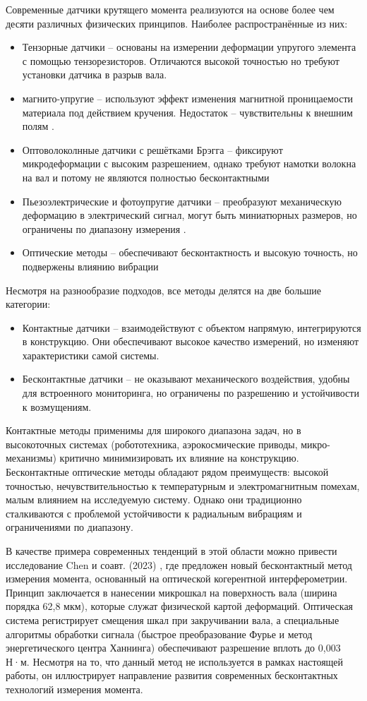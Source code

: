 Современные датчики крутящего момента реализуются на основе более чем десяти различных физических принципов. Наиболее распространённые из них:
\begin{itemize}
	\item Тензорные датчики -- основаны на измерении деформации упругого элемента с помощью тензорезисторов. Отличаются высокой точностью но требуют установки датчика в разрыв вала\cite{}.
	\item магнито-упругие -- используют эффект изменения магнитной проницаемости материала под действием кручения. Недостаток -- чувствительны к внешним полям \cite{}.
	\item Оптоволоколнные датчики с решётками Брэгга -- фиксируют микродеформации с высоким разрешением, однако требуют намотки волокна на вал и потому не являются полностью бесконтактными \cite{}%
	\item Пьезоэлектрические и фотоупругие датчики -- преобразуют механическую деформацию в электрический сигнал, могут быть миниатюрных размеров, но ограничены по диапазону измерения \cite{}.
	\item Оптические методы -- обеспечивают бесконтактность и высокую точность, но подвержены влиянию вибрации \cite{}
\end{itemize}
Несмотря на разнообразие подходов, все методы делятся на две большие категории:
\begin{itemize}
	\item Контактные датчики -- взаимодействуют с объектом напрямую, интегрируются в конструкцию. Они обеспечивают высокое качество измерений, но изменяют характеристики самой системы.
	\item Бесконтактные датчики -- не оказывают механического воздействия, удобны для встроенного мониторинга, но ограничены по разрешению и устойчивости к возмущениям. \cite{} 	
\end{itemize} 

Контактные методы применимы для широкого диапазона задач, но в высокоточных системах (робототехника, аэрокосмические приводы, микро-механизмы) критично минимизировать их влияние на конструкцию. Бесконтактные оптические методы обладают рядом преимуществ: высокой точностью, нечувствительностью к температурным и электромагнитным помехам, малым влиянием на исследуемую систему. Однако они традиционно сталкиваются с проблемой устойчивости к радиальным вибрациям и ограничениями по диапазону.

В качестве примера современных тенденций в этой области можно привести исследование Chen и соавт. (2023) \cite{}, где предложен новый бесконтактный метод измерения момента, основанный на оптической когерентной интерферометрии. Принцип заключается в нанесении микрошкал на поверхность вала (ширина порядка 62,8 мкм), которые служат физической картой деформаций. Оптическая система регистрирует смещения шкал при закручивании вала, а специальные алгоритмы обработки сигнала (быстрое преобразование Фурье и метод энергетического центра Ханнинга) обеспечивают разрешение вплоть до 0,003 Н·м. Несмотря на то, что данный метод не используется в рамках настоящей работы, он иллюстрирует направление развития современных бесконтактных технологий измерения момента.

